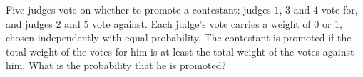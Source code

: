 Five judges vote on whether to promote a contestant: judges $1$, $3$ and $4$ vote for, and judges $2$ and $5$ vote against. Each judge's vote carries a weight of $0$ or $1$, chosen independently with equal probability. The contestant is promoted if the total weight of the votes for him is at least the total weight of the votes against him. What is the probability that he is promoted?
